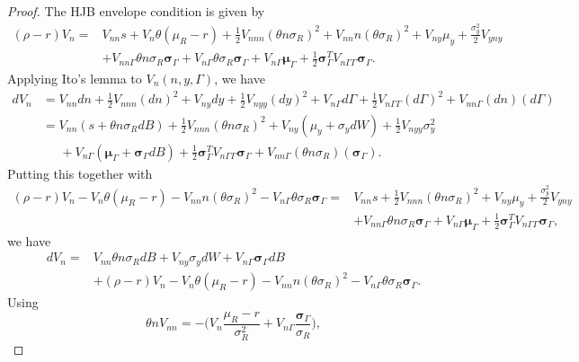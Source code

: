 \documentclass[11pt]{extarticle}
\theoremstyle{plain}
\theoremstyle{definition}
\begin{document}
\vspace{2mm}
\noindent
\begin{proof}
	
	The HJB envelope condition is given by
	\begin{align*}
		(\rho - r) V_n = & V_{nn} s + V_n  \theta (\mu_R - r) + \frac{1}{2} V_{nnn} (\theta n \sigma_R )^2 +  V_{nn} n (\theta \sigma_R )^2  + V_{ny} \mu_y + \frac{\sigma_y^2}{2} V_{yny} \\
		& + V_{nn \Gamma} \theta n \sigma_R  \bm \sigma_\Gamma + V_{n \Gamma} \theta \sigma_R  \bm \sigma_\Gamma  + V_{n\Gamma} \bm \mu_\Gamma  + \frac{1}{2} \bm \sigma_\Gamma^T V_{ n \Gamma \Gamma} \bm \sigma_\Gamma.
	\end{align*}
	Applying Ito's lemma to $V_n(n, y, \Gamma)$, we have 
	\begin{align*}
		dV_n &= V_{nn} dn + \frac{1}{2} V_{nnn} (dn)^2 + V_{ny} dy + \frac{1}{2} V_{nyy} (dy)^2 + V_{n \Gamma} d\Gamma + \frac{1}{2} V_{n\Gamma \Gamma} (d\Gamma)^2  + V_{nn \Gamma} (dn) ( d \Gamma) \\
		&= V_{nn} (s + \theta n \sigma_R dB) + \frac{1}{2} V_{nnn} (\theta n \sigma_R)^2 + V_{ny} (\mu_y + \sigma_y dW) + \frac{1}{2} V_{nyy} \sigma_y^2 \\
		& \;\;\;\;\; + V_{n \Gamma} (\bm \mu_\Gamma + \bm \sigma_\Gamma dB ) + \frac{1}{2} \bm{\sigma}_\Gamma^T V_{n\Gamma \Gamma} \bm \sigma_\Gamma  + V_{nn \Gamma} (\theta n \sigma_R) ( \bm{\sigma}_\Gamma).
	\end{align*}
	Putting this together with 
	\begin{align*}
		(\rho - r) V_n - V_n  \theta (\mu_R - r) -  V_{nn} n (\theta \sigma_R )^2 - V_{n \Gamma} \theta \sigma_R  \bm \sigma_\Gamma  = & V_{nn} s + \frac{1}{2} V_{nnn} (\theta n \sigma_R )^2  + V_{ny} \mu_y + \frac{\sigma_y^2}{2} V_{yny} \\
		& + V_{nn \Gamma} \theta n \sigma_R  \bm \sigma_\Gamma + V_{n\Gamma} \bm \mu_\Gamma  + \frac{1}{2} \bm \sigma_\Gamma^T V_{ n \Gamma \Gamma} \bm \sigma_\Gamma,
	\end{align*}
	we have 
	\begin{align*}
		dV_n = &V_{nn} \theta n \sigma_R dB + V_{ny} \sigma_y dW + V_{n \Gamma}  \bm \sigma_\Gamma dB  \\
		&  + (\rho - r) V_n - V_n  \theta (\mu_R - r) -  V_{nn} n (\theta \sigma_R )^2 - V_{n \Gamma} \theta \sigma_R  \bm \sigma_\Gamma. 
	\end{align*}
	Using 
	\begin{equation*}
		\theta n V_{nn} = - \bigg( V_n \frac{\mu_R - r}{\sigma_R^2 } + V_{n \Gamma} \frac{ \bm \sigma_\Gamma }{\sigma_R} \bigg),

\end{equation*}
\end{proof}
\end{document}

